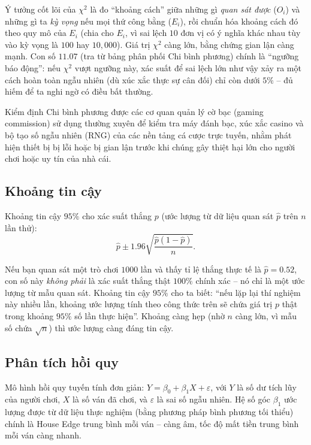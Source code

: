 \documentclass[12pt,a4paper]{article}
\theoremstyle{coloredthm}
\theoremstyle{coloreddef}
\theoremstyle{remark}
\begin{document}
\begin{giaithich}
Ý tưởng cốt lõi của $\chi^2$ là đo ``khoảng cách'' giữa những gì \emph{quan sát được} ($O_i$) và những gì ta \emph{kỳ vọng} nếu mọi thứ công bằng ($E_i$), rồi chuẩn hóa khoảng cách đó theo quy mô của $E_i$ (chia cho $E_i$, vì sai lệch $10$ đơn vị có ý nghĩa khác nhau tùy vào kỳ vọng là $100$ hay $10{,}000$). Giá trị $\chi^2$ càng lớn, bằng chứng gian lận càng mạnh. Con số $11.07$ (tra từ bảng phân phối Chi bình phương) chính là ``ngưỡng báo động'': nếu $\chi^2$ vượt ngưỡng này, xác suất để sai lệch lớn như vậy xảy ra một cách hoàn toàn ngẫu nhiên (dù xúc xắc thực sự cân đối) chỉ còn dưới $5\%$ -- đủ hiếm để ta nghi ngờ có điều bất thường.
\end{giaithich}

\begin{ungdung}
Kiểm định Chi bình phương được các cơ quan quản lý cờ bạc (gaming commission) sử dụng thường xuyên để kiểm tra máy đánh bạc, xúc xắc casino và bộ tạo số ngẫu nhiên (RNG) của các nền tảng cá cược trực tuyến, nhằm phát hiện thiết bị bị lỗi hoặc bị gian lận trước khi chúng gây thiệt hại lớn cho người chơi hoặc uy tín của nhà cái.
\end{ungdung}

\subsection{Khoảng tin cậy}

Khoảng tin cậy $95\%$ cho xác suất thắng $p$ (ước lượng từ dữ liệu quan sát $\hat{p}$ trên $n$ lần thử):
\[
\hat{p} \pm 1.96\sqrt{\frac{\hat{p}(1-\hat{p})}{n}}.
\]

\begin{giaithich}
Nếu bạn quan sát một trò chơi $1000$ lần và thấy tỉ lệ thắng thực tế là $\hat p = 0.52$, con số này \emph{không phải} là xác suất thắng thật $100\%$ chính xác -- nó chỉ là một ước lượng từ mẫu quan sát. Khoảng tin cậy $95\%$ cho ta biết: ``nếu lặp lại thí nghiệm này nhiều lần, khoảng ước lượng tính theo công thức trên sẽ chứa giá trị $p$ thật trong khoảng $95\%$ số lần thực hiện''. Khoảng càng hẹp (nhờ $n$ càng lớn, vì mẫu số chứa $\sqrt{n}$) thì ước lượng càng đáng tin cậy.
\end{giaithich}

\subsection{Phân tích hồi quy}

Mô hình hồi quy tuyến tính đơn giản: $Y = \beta_0 + \beta_1 X + \varepsilon$, với $Y$ là số dư tích lũy của người chơi, $X$ là số ván đã chơi, và $\varepsilon$ là sai số ngẫu nhiên. Hệ số góc $\beta_1$ ước lượng được từ dữ liệu thực nghiệm (bằng phương pháp bình phương tối thiểu) chính là House Edge trung bình mỗi ván -- càng âm, tốc độ mất tiền trung bình mỗi ván càng nhanh.
\end{document}

